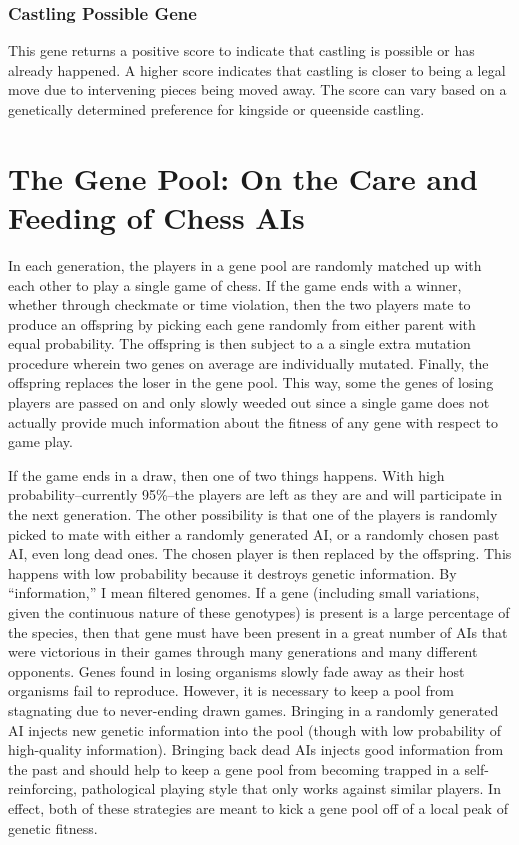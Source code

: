 \documentclass[letterpaper]{article}
\renewcommand\_{\textunderscore\allowbreak}
\begin{document}
\subsubsection{Castling Possible Gene}
This gene returns a positive score to indicate that castling is possible or has already happened. A higher score indicates that castling is closer to being a legal move due to intervening pieces being moved away. The score can vary based on a genetically determined preference for kingside or queenside castling.




\section{The Gene Pool: On the Care and Feeding of Chess AIs}

In each generation, the players in a gene pool are randomly matched up with each other to play a single game of chess. If the game ends with a winner, whether through checkmate or time violation, then the two players mate to produce an offspring by picking each gene randomly from either parent with equal probability. The offspring is then subject to a a single extra mutation procedure wherein two genes on average are individually mutated. Finally, the offspring replaces the loser in the gene pool. This way, some the genes of losing players are passed on and only slowly weeded out since a single game does not actually provide much information about the fitness of any gene with respect to game play.

If the game ends in  a draw, then one of two things happens. With high probability--currently 95\%--the players are left as they are and will participate in the next generation. The other possibility is that one of the players is randomly picked to mate with either a randomly generated AI, or a randomly chosen past AI, even long dead ones. The chosen player is then replaced by the offspring. This happens with low probability because it destroys genetic information. By ``information,'' I mean filtered genomes. If a gene (including small variations, given the continuous nature of these genotypes) is present is a large percentage of the species, then that gene must have been present in a great number of AIs that were victorious in their games through many generations and many different opponents. Genes found in losing organisms slowly fade away as their host organisms fail to reproduce. However, it is necessary to keep a pool from stagnating due to never-ending drawn games. Bringing in a randomly generated AI injects new genetic information into the pool (though with low probability of high-quality information). Bringing back dead AIs injects good information from the past and should help to keep a gene pool from becoming trapped in a self-reinforcing, pathological playing style that only works against similar players. In effect, both of these strategies are meant to kick a gene pool off of a local peak of genetic fitness.
\end{document}

